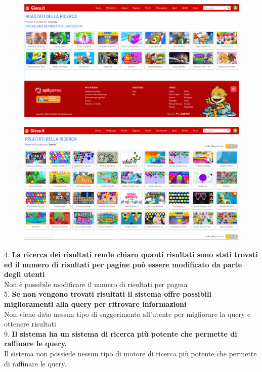 \documentclass[../Report.tex]{subfiles}
\begin{document}
    \begin{figure}[H]
        \includegraphics[width=\linewidth]{Assestment4.png}
        \centering
    \end{figure}
    \begin{figure}[H]
        \includegraphics[width=\linewidth]{Assestment5.png}
        \centering
    \end{figure}

    4. \textbf{La ricerca dei risultati rende chiaro quanti risultati sono stati trovati ed il numero di risultati per pagine può essere modificato da parte degli utenti} \\
    Non è possibile modificare il numero di risultati per pagina\\

    5.\textbf{ Se non vengono trovati risultati il sistema offre possibili miglioramenti alla query per ritrovare informazioni }\\
    Non viene dato nessun tipo di suggerimento all’utente per migliorare la query e ottenere risultati \\

    9. \textbf{Il sistema ha un sistema di ricerca più potente che permette di raffinare le query.}\\
    Il sistema non possiede nessun tipo di motore di ricerca più potente che permette di  raffinare le query.\\
    
\end{document}
